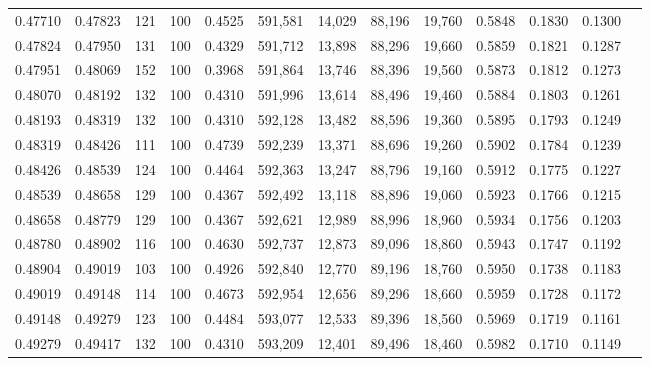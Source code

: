 \begin{tabular}{rrrrrrrrrrrrr}
0.47710 & 0.47823 &   121 & 100 &                                     0.4525 & 591,581 &  14,029 &  88,196 &  19,760 & 0.5848 & 0.1830 & 0.1300 \\
0.47824 & 0.47950 &   131 & 100 &                                     0.4329 & 591,712 &  13,898 &  88,296 &  19,660 & 0.5859 & 0.1821 & 0.1287 \\
0.47951 & 0.48069 &   152 & 100 &                                     0.3968 & 591,864 &  13,746 &  88,396 &  19,560 & 0.5873 & 0.1812 & 0.1273 \\
0.48070 & 0.48192 &   132 & 100 &                                     0.4310 & 591,996 &  13,614 &  88,496 &  19,460 & 0.5884 & 0.1803 & 0.1261 \\
0.48193 & 0.48319 &   132 & 100 &                                     0.4310 & 592,128 &  13,482 &  88,596 &  19,360 & 0.5895 & 0.1793 & 0.1249 \\
0.48319 & 0.48426 &   111 & 100 &                                     0.4739 & 592,239 &  13,371 &  88,696 &  19,260 & 0.5902 & 0.1784 & 0.1239 \\
0.48426 & 0.48539 &   124 & 100 &                                     0.4464 & 592,363 &  13,247 &  88,796 &  19,160 & 0.5912 & 0.1775 & 0.1227 \\
0.48539 & 0.48658 &   129 & 100 &                                     0.4367 & 592,492 &  13,118 &  88,896 &  19,060 & 0.5923 & 0.1766 & 0.1215 \\
0.48658 & 0.48779 &   129 & 100 &                                     0.4367 & 592,621 &  12,989 &  88,996 &  18,960 & 0.5934 & 0.1756 & 0.1203 \\
0.48780 & 0.48902 &   116 & 100 &                                     0.4630 & 592,737 &  12,873 &  89,096 &  18,860 & 0.5943 & 0.1747 & 0.1192 \\
0.48904 & 0.49019 &   103 & 100 &                                     0.4926 & 592,840 &  12,770 &  89,196 &  18,760 & 0.5950 & 0.1738 & 0.1183 \\
0.49019 & 0.49148 &   114 & 100 &                                     0.4673 & 592,954 &  12,656 &  89,296 &  18,660 & 0.5959 & 0.1728 & 0.1172 \\
0.49148 & 0.49279 &   123 & 100 &                                     0.4484 & 593,077 &  12,533 &  89,396 &  18,560 & 0.5969 & 0.1719 & 0.1161 \\
0.49279 & 0.49417 &   132 & 100 &                                     0.4310 & 593,209 &  12,401 &  89,496 &  18,460 & 0.5982 & 0.1710 & 0.1149 \\

\end{tabular}
